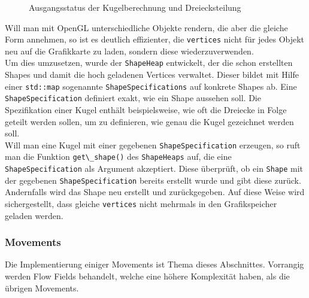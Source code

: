 \documentclass[11pt,a4paper]{article}
\begin{document}
\begin{center}
\begin{figure}[!ht]
\centering
\vspace{20pt}
\caption[Ausgangsstatus der Kugelberechnung und Dreiecksteilung]{Ausgangsstatus der Kugelberechnung und Dreiecksteilung}
\label{fig:kugelVertices}
\end{figure}
\end{center}
\noindent
Will man mit OpenGL unterschiedliche Objekte rendern, die aber die gleiche Form annehmen, so ist es deutlich effizienter, die \lstinline!vertices! nicht für jedes Objekt neu auf die Grafikkarte zu laden, sondern diese wiederzuverwenden.\\
Um dies umzusetzen, wurde der \lstinline!ShapeHeap! entwickelt, der die schon erstellten Shapes und damit die hoch geladenen Vertices verwaltet. Dieser bildet mit Hilfe einer \lstinline!std::map! sogenannte \lstinline!ShapeSpecifications! auf konkrete Shapes ab. Eine \lstinline!ShapeSpecification! definiert exakt, wie ein Shape aussehen soll. Die Spezifikation einer Kugel enthält beispielsweise, wie oft die Dreiecke in Folge geteilt werden sollen, um zu definieren, wie genau die Kugel gezeichnet werden soll.\\
Will man eine Kugel mit einer gegebenen \lstinline!ShapeSpecification! erzeugen, so ruft man die Funktion \lstinline!get\_shape()! des \lstinline!ShapeHeaps! auf, die eine \lstinline!ShapeSpecification! als Argument akzeptiert. Diese überprüft, ob ein \lstinline!Shape! mit der gegebenen \lstinline!ShapeSpecification! bereits erstellt wurde und gibt diese zurück. Andernfalls wird das Shape neu erstellt und zurückgegeben. Auf diese Weise wird sichergestellt, dass gleiche \lstinline!vertices! nicht mehrmals in den Grafikspeicher geladen werden.

\subsubsection{Movements}
Die Implementierung einiger Movements ist Thema dieses Abschnittes. Vorrangig werden Flow Fields behandelt, welche eine höhere Komplexität haben, als die übrigen Movements.
\end{document}
